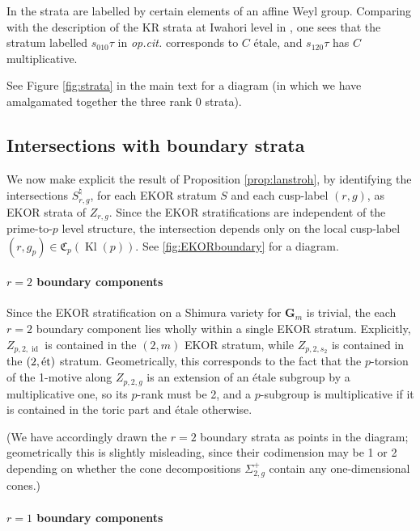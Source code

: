 \documentclass[cjm]{ipart}
\theoremstyle{plain}
\theoremstyle{remark}
\DeclareMathOperator{\id}{id}
\DeclareMathOperator{\Kl}{Kl}
\newcommand{\et}{\text{\textup{\'et}}}
\numberwithin{equation}{subsection}
\begin{document}
  \begin{remark}
   In \cite{shenyuzhang21} the strata are labelled by certain elements of an affine Weyl group. Comparing with the description of the KR strata at Iwahori level in \cite{yu10}, one sees that the stratum labelled $s_{010}\tau$ in \emph{op.cit.} corresponds to $C$ \'etale, and $s_{120}\tau$ has $C$ multiplicative.
  \end{remark}

  See Figure \ref{fig:strata} in the main text for a diagram (in which we have amalgamated together the three rank 0 strata).


 \subsection{Intersections with boundary strata}
  \label{sect:explcitintersection}
  We now make explicit the result of Proposition \ref{prop:lanstroh}, by identifying the intersections $S_{r, g}^\natural$, for each EKOR stratum $S$ and each cusp-label $(r, g)$, as EKOR strata of $Z_{r, g}$. Since the EKOR stratifications are independent of the prime-to-$p$ level structure, the intersection depends only on the local cusp-label $(r, g_p) \in \mathfrak{C}_p(\Kl(p))$. See \cref{fig:EKORboundary} for a diagram.

  \paragraph*{$r = 2$ boundary components}

   Since the EKOR stratification on a Shimura variety for $\mathbf{G}_m$ is trivial, the each $r = 2$ boundary component lies wholly within a single EKOR stratum. Explicitly, $Z_{p, 2, \id}$ is contained in the $(2, m)$ EKOR stratum, while $Z_{p, 2, s_2}$ is contained in the $(2, \et)$ stratum. Geometrically, this corresponds to the fact that the $p$-torsion of the 1-motive along $Z_{p, 2, g}$ is an extension of an \'etale subgroup by a multiplicative one, so its $p$-rank must be 2, and a $p$-subgroup is multiplicative if it is contained in the toric part and \'etale otherwise.
   
   (We have accordingly drawn the $r = 2$ boundary strata as points in the diagram; geometrically this is slightly misleading, since their codimension may be 1 or 2 depending on whether the cone decompositions $\Sigma_{2, g}^+$ contain any one-dimensional cones.)

  \paragraph*{$r = 1$ boundary components}
\end{document}
